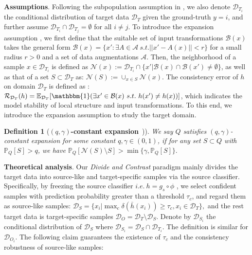 \documentclass{article}
\newtheorem{definition}{Definition}[section]
\begin{document}
\textbf{Assumptions}. Following the subpopulation assumption in \cite{NIPS_2021_cycle,ICLR_2021_theory_wei,ICML_2021_theory_lp,ben2010theory}, we also denote $\mathcal{D}_{T_i}$ the conditional distribution of target data $\mathcal{D}_T$ given the ground-truth $y=i$, and further assume $\mathcal{D}_{T_i} \cap \mathcal{D}_{T_j} = \emptyset$ for all $i\neq j$. 
To introduce the expansion assumption \cite{ICML_2021_theory_lp,ICLR_2021_theory_wei}, we first define that the suitable set of input transformations ${\mathcal{B}(x)}$ takes the general form ${\mathcal{B}(x)} = \{x': \exists A \in \mathcal{A} \ s.t. ||x'-A(x)||< r     \}$ for a small radius $r>0$ and a set of data augmentations $\mathcal{A}$. 
Then, the neighborhood of a sample $x \in \mathcal{D}_{T_i}$ is defined as $\mathcal{N}(x):= \mathcal{D}_{T_i} \cap \{x'|\mathcal{B}(x)\cap \mathcal{B}(x') \neq \emptyset \}$, as well as that of a set $S\subset \mathcal{D}_T$ as: $\mathcal{N}(S) := \cup_{x\in S} \mathcal{N}(x)$. The consistency error of $h$ on domain $\mathcal{D}_T$ is defined as : $\mathcal{R}_{\mathcal{D}_T}(h) = \mathbb{E}_{\mathcal{D}_T}[\mathbbm{1}(\exists x' \in \mathcal{B}(x) \ s.t. \ h(x')\neq h(x))]$, which indicates the model stability of local structure and input transformations.
To this end, we introduce the expansion assumption to study the target domain.

\begin{definition}[\textbf{$(q,\gamma)$-constant expansion}~\cite{ICML_2021_theory_lp,ICLR_2021_theory_wei})]\label{expansion}
 We say $Q$ satisfies $(q,\gamma)$-constant expansion for some constant $q,\gamma \in (0,1)$, if for any set $S \subset Q$ with $ \mathbb{P}_{Q}[S] >q$, we have $\mathbb{P}_{Q}[\mathcal{N}(S) \setminus S]>\min{\{\gamma,\mathbb{P}_{Q}[S]\}}.$
\end{definition}

\textbf{Theoretical analysis}. Our \textit{Divide and Contrast} paradigm mainly divides the target data into source-like and target-specific samples via the source classifier. Specifically, by freezing the source classifier $i.e. \ h = g_s \circ \phi$ \cite{shot},
we select confident samples with prediction probability greater than a threshold $\tau_c$, and regard them as source-like samples:
$
    \mathcal{D}_S = \{x_i| \max_c \delta( \bar{h}(x_i)) \geq \tau_c , x_i \in \mathcal{D}_T\},
$
and the rest target data is target-specific samples $\mathcal{D}_O = \mathcal{D}_T \setminus \mathcal{D}_S$. Denote by $\mathcal{D}_{S_i}$ the conditional distribution of $\mathcal{D}_{S}$ where $\mathcal{D}_{S_i} = \mathcal{D}_S \cap \mathcal{D}_{T_i}$. The definition is similar for $\mathcal{D}_{O_i}$. 
The following claim guarantees the existence of $\tau_c$ and the consistency robustness of source-like samples:
\end{document}
